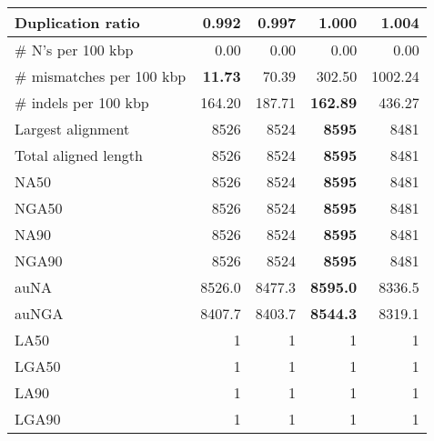 \documentclass[12pt,a4paper]{article}
\begin{document}
\begin{table}[ht]
\begin{center}
\begin{tabular}{|l*{4}{|r}|}
Duplication ratio & {\bf 0.992} & 0.997 & 1.000 & 1.004 \\ \hline
\# N's per 100 kbp & 0.00 & 0.00 & 0.00 & 0.00 \\ \hline
\# mismatches per 100 kbp & {\bf 11.73} & 70.39 & 302.50 & 1002.24 \\ \hline
\# indels per 100 kbp & 164.20 & 187.71 & {\bf 162.89} & 436.27 \\ \hline
Largest alignment & 8526 & 8524 & {\bf 8595} & 8481 \\ \hline
Total aligned length & 8526 & 8524 & {\bf 8595} & 8481 \\ \hline
NA50 & 8526 & 8524 & {\bf 8595} & 8481 \\ \hline
NGA50 & 8526 & 8524 & {\bf 8595} & 8481 \\ \hline
NA90 & 8526 & 8524 & {\bf 8595} & 8481 \\ \hline
NGA90 & 8526 & 8524 & {\bf 8595} & 8481 \\ \hline
auNA & 8526.0 & 8477.3 & {\bf 8595.0} & 8336.5 \\ \hline
auNGA & 8407.7 & 8403.7 & {\bf 8544.3} & 8319.1 \\ \hline
LA50 & 1 & 1 & 1 & 1 \\ \hline
LGA50 & 1 & 1 & 1 & 1 \\ \hline
LA90 & 1 & 1 & 1 & 1 \\ \hline
LGA90 & 1 & 1 & 1 & 1 \\ \hline
\end{tabular}
\end{center}
\end{table}
\end{document}
